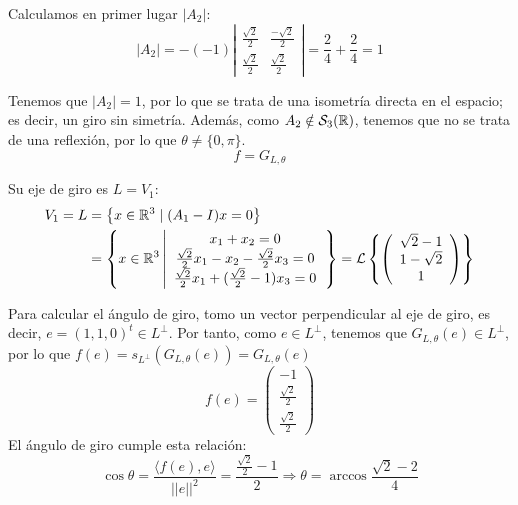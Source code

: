 \begin{ejercicio}
\begin{enumerate}
        Calculamos en primer lugar $|A_2|$:
        \begin{equation*}
            |A_2| = -(-1) \left|\begin{array}{cc}
            \frac{\sqrt{2}}{2} & \frac{-\sqrt{2}}{2} \\
            \frac{\sqrt{2}}{2} & \frac{\sqrt{2}}{2}
        \end{array}\right| = \frac{2}{4}+\frac{2}{4} = 1
        \end{equation*}

        Tenemos que $|A_2|=1$, por lo que se trata de una isometría directa en el espacio; es decir, un giro sin simetría. Además, como $A_2\notin \mathcal{S}_3(\mathbb{R})$, tenemos que no se trata de una reflexión, por lo que $\theta\neq \{0,\pi\}$.
        \begin{equation*}
            f=G_{L,\theta}
        \end{equation*}

        Su eje de giro es $L=V_{1}$:
        \begin{equation*}
            \begin{split}
                V_{1}=L& = \left\{x\in \mathbb{R}^3 \mid (A_1-I)x=0\right\}\\
                & = \left\{x\in \mathbb{R}^3 \left|
                \begin{array}{c}
                    x_1+x_2=0 \\
                    \frac{\sqrt{2}}{2}x_1 -x_2 - \frac{\sqrt{2}}{2}x_3 =0 \\
                    \frac{\sqrt{2}}{2} x_1 +(\frac{\sqrt{2}}{2}-1)x_3=0
                \end{array}
                \right.\right\}
                = \mathcal{L}\left\{\left(\begin{array}{c}
                     \sqrt{2}-1 \\ 1-\sqrt{2} \\ 1
                \end{array}\right)\right\}
            \end{split}
        \end{equation*}

        Para calcular el ángulo de giro, tomo un vector perpendicular al eje de giro, es decir, $e=(1, 1, 0)^t\in L^\perp$. Por tanto, como $e\in L^\perp$, tenemos que $G_{L,\theta}(e)\in L^\perp$, por lo que $f(e)=s_{L^\perp}(G_{L,\theta}(e))=G_{L,\theta}(e)$
        \begin{equation*}
            f(e)=\left(\begin{array}{c}
                     -1 \\ \frac{\sqrt{2}}{2} \\ \frac{\sqrt{2}}{2}
                \end{array}\right)
        \end{equation*}
        El ángulo de giro cumple esta relación:
        \begin{equation*}
            \cos \theta = \frac{\langle f(e),e\rangle}{||e||^2} = \frac{\frac{\sqrt{2}}{2}-1}{2} \Longrightarrow \theta = \arccos{\frac{\sqrt{2}-2}{4}}
        \end{equation*}


\end{enumerate}
\end{ejercicio}
